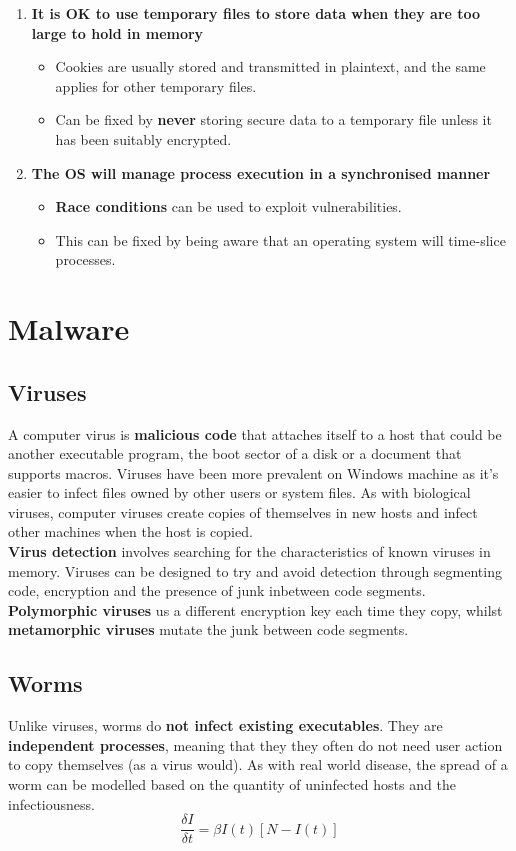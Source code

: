 \documentclass{article}
\newcommand{\np}{\vspace{8pt} \\}
\begin{document}
\begin{enumerate}
\begin{itemize}
	\end{itemize}
	\item \textbf{It is OK to use temporary files to store data when they are too large to hold in memory}
	\begin{itemize}
		\item Cookies are usually stored and transmitted in plaintext, and the same applies for other temporary files.
		\item Can be fixed by \textbf{never} storing secure data to a temporary file unless it has been suitably encrypted.
	\end{itemize}
	\item \textbf{The OS will manage process execution in a synchronised manner}
	\begin{itemize}
		\item \textbf{Race conditions} can be used to exploit vulnerabilities.
		\item This can be fixed by being aware that an operating system will time-slice processes.
	\end{itemize}
\end{enumerate}

\section{Malware}

\subsection{Viruses}
A computer virus is \textbf{malicious code} that attaches itself to a host that could be another executable program, the boot sector of a disk or a document that supports macros. Viruses have been more prevalent on Windows machine as it's easier to infect files owned by other users or system files. As with biological viruses, computer viruses create copies of themselves in new hosts and infect other machines when the host is copied. \np
\textbf{Virus detection} involves searching for the characteristics of known viruses in memory. Viruses can be designed to try and avoid detection through segmenting code, encryption and the presence of junk inbetween code segments. \textbf{Polymorphic viruses} us a different encryption key each time they copy, whilst \textbf{metamorphic viruses} mutate the junk between code segments.

\subsection{Worms}
Unlike viruses, worms do \textbf{not infect existing executables}. They are \textbf{independent processes}, meaning that they they often do not need user action to copy themselves (as a virus would). As with real world disease, the spread of a worm can be modelled based on the quantity of uninfected hosts and the infectiousness.
\[
	\frac{\delta I}{\delta t} = \beta I(t) [N - I(t)]
\]
\end{document}
